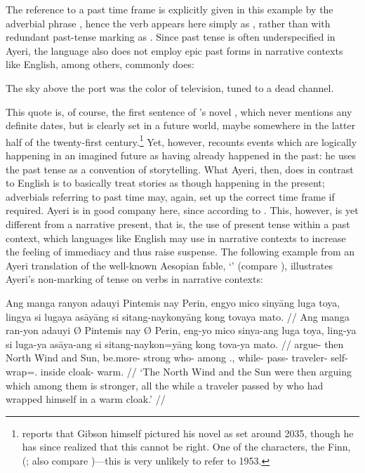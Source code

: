 The reference to a past time frame is explicitly given in this example by the 
adverbial phrase , hence the verb 
appears here simply as , rather than with redundant 
past-tense marking as . Since past tense is often 
underspecified in Ayeri, the language also does not employ epic past forms in 
narrative contexts like English, among others, commonly does: 

\ex\label{ex:neuromancer}
	The sky above the port was the color of television, tuned to a dead 
	channel. 
\xe

This quote is, of course, the first sentence of 
\citeauthor{gibson:neuromancer}'s novel , which 
never mentions any definite dates, but is clearly set in a future world, maybe 
somewhere in the latter half of the twenty-first century.\footnote{%
\citet{christian2017} reports that Gibson himself pictured his novel as set 
around 2035, though he has since realized that this cannot be right. One of 
the characters, the Finn,  (\cite{christian2017}; also compare 
\cite[92]{gibson:neuromancer})---this is very unlikely to refer to 1953.} Yet, 
however, \citeauthor{gibson:neuromancer} recounts events which are logically 
happening in an imagined future as having already happened in the past: he 
uses the past tense as a convention of storytelling. What Ayeri, then, does in 
contrast to English is to basically treat stories as though happening in the 
present; adverbials referring to past time may, again, set up the correct time 
frame if required. Ayeri is in good company here, since according to 
\citeauthor{dahl1985} . This, however, is 
yet different from a narrative present, that is, the use of present tense 
within a past context, which languages like English may use in narrative 
contexts to increase the feeling of immediacy and thus raise suspense. The 
following example from an Ayeri translation of the well-known Aesopian fable, 
`' (compare \cite{aesop:northwind}), illustrates 
Ayeri's non-marking of tense on verbs in narrative contexts:

\ex
\begingl
	\gla Ang manga ranyon adauyi {} Pintemis nay {} Perin, engyo mico 
		sinyāng luga toya, lingya si lugaya asāyāng si sitang-naykonyāng 
		kong tovaya mato. //
	\glb Ang manga ran-yon adauyi Ø Pintemis nay Ø Perin, eng-yo mico 
		sinya-ang luga toya, ling-ya si luga-ya asāya-ang si 
		sitang-naykon=yāng kong tova-ya mato. //
	\glc \AgtT{} \Prog{} argue-\TplN{} then \Top{} {North Wind} and 
		\Top{} Sun, be.more-\TsgN{} strong who-\Aarg{} among 
		\TplN{}.\Loc{}, while-\Loc{} \Rel{} pass-\TsgM{} 
		traveler-\Aarg{} \Rel{} self-wrap=\TsgM{}.\Aarg{} inside 
		cloak-\Loc{} warm. //
	\glft `The North Wind and the Sun were then arguing which among them is 
		stronger, all the while a traveler passed by who had wrapped 
		himself in a warm cloak.' //
\endgl
\xe


